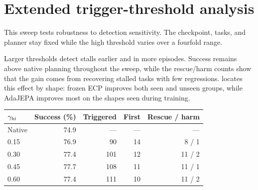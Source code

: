\begin{table}[!t]
\begin{minipage}[t]{\columnwidth}
\section{Extended trigger-threshold analysis}
\label{sec:threshold-details}
This sweep tests robustness to detection sensitivity. The checkpoint, tasks, and planner stay fixed while the high threshold varies over a fourfold range.\par\smallskip
\normalsize
Larger thresholds detect stalls earlier and in more episodes. Success remains above native planning throughout the sweep, while the rescue/harm counts show that the gain comes from recovering stalled tasks with few regressions.  locates this effect by shape: frozen ECP improves both seen and unseen groups, while AdaJEPA improves most on the shapes seen during training.\par
\end{minipage}\hfill
\begin{minipage}[t]{\columnwidth}
\vspace{0pt}
\par\smallskip
{\centering
\centering
{}
\label{tab:threshold}
\small
\setlength{\tabcolsep}{4pt}
\begin{tabular}{lrrrr}
\toprule
$\gamma_{\rm hi}$ & Success (\%) & Triggered & First & Rescue / harm\\
\midrule
Native &74.9&---&---&---\\
0.15 &76.9&90&14&8 / 1\\
0.30 &77.4&101&12&11 / 2\\
0.45 &77.7&108&11&11 / 1\\
0.60 &77.4&111&10&11 / 2\\
\bottomrule
\end{tabular}
\par}
\end{minipage}\par
\par\smallskip
{\centering
{}
}
\end{table}
